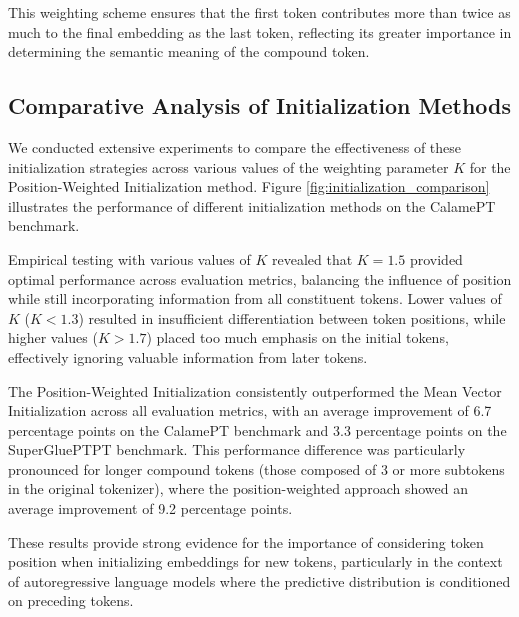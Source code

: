 This weighting scheme ensures that the first token contributes more than twice as much to the final embedding as the last token, reflecting its greater importance in determining the semantic meaning of the compound token.

\subsection{Comparative Analysis of Initialization Methods}
We conducted extensive experiments to compare the effectiveness of these initialization strategies across various values of the weighting parameter $K$ for the Position-Weighted Initialization method. Figure \ref{fig:initialization_comparison} illustrates the performance of different initialization methods on the CalamePT benchmark.

Empirical testing with various values of $K$ revealed that $K = 1.5$ provided optimal performance across evaluation metrics, balancing the influence of position while still incorporating information from all constituent tokens. Lower values of $K$ ($K < 1.3$) resulted in insufficient differentiation between token positions, while higher values ($K > 1.7$) placed too much emphasis on the initial tokens, effectively ignoring valuable information from later tokens.

The Position-Weighted Initialization consistently outperformed the Mean Vector Initialization across all evaluation metrics, with an average improvement of 6.7 percentage points on the CalamePT benchmark and 3.3 percentage points on the SuperGluePTPT benchmark. This performance difference was particularly pronounced for longer compound tokens (those composed of 3 or more subtokens in the original tokenizer), where the position-weighted approach showed an average improvement of 9.2 percentage points.

These results provide strong evidence for the importance of considering token position when initializing embeddings for new tokens, particularly in the context of autoregressive language models where the predictive distribution is conditioned on preceding tokens.
